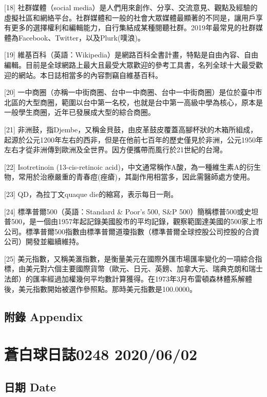 \documentclass[a5paper, 11pt
]{book}
\begin{document}
{[}18{]} 社群媒體（social
media）是人們用來創作、分享、交流意見、觀點及經驗的虛擬社區和網絡平台。社群媒體和一般的社會大眾媒體最顯著的不同是，讓用戶享有更多的選擇權利和編輯能力，自行集結成某種閱聽社群。2019年最常見的社群媒體為Facebook、Twitter，以及Plurk(噗浪)。

{[}19{]}
維基百科（英語：Wikipedia）是網路百科全書計畫，特點是自由內容、自由編輯。目前是全球網路上最大且最受大眾歡迎的參考工具書，名列全球十大最受歡迎的網站。本日誌相當多的內容剽竊自維基百科。

{[}20{]}
一中商圈（亦稱一中街商圈、台中一中商圈、台中一中街商圈）是位於臺中市北區的大型商圈，範圍以台中第一名校，也就是台中第一高級中學為核心，原本是一般學生商圈，近年已發展成大型的綜合商圈。

{[}21{]}
非洲鼓，指Djembe，又稱金貝鼓，由皮革鼓皮覆蓋高腳杯狀的木箱所組成，起源於公元1200年左右的西非，但是在他前七百年的歷史僅見於非洲，公元1950年左右才從非洲傳到歐洲及全世界。因方便攜帶而風行於21世紀的台灣。

{[}22{]} Isotretinoin (13-cis-retinoic
acid)，中文通常稱作A酸，為一種維生素A的衍生物，常用於治療嚴重的青春痘(痤瘡)，其副作用相當多，因此需醫師處方使用。

{[}23{]} QD，為拉丁文quaque die的縮寫，表示每日一劑。

{[}24{]} 標準普爾500（英語：Standard \& Poor's 500, S\&P
500）簡稱標普500或史坦普500，是一個由1957年起記錄美國股市的平均記錄，觀察範圍達美國的500家上市公司。標準普爾500指數由標準普爾道瓊指數（標準普爾全球控股公司控股的合資公司）開發並繼續維持。

{[}25{]}
美元指數，又稱美滙指數，是衡量美元在國際外匯市場匯率變化的一項綜合指標，由美元對六個主要國際貨幣（歐元、日元、英鎊、加拿大元、瑞典克朗和瑞士法郎）的匯率經過加權幾何平均數計算獲得。在1973年3月布雷頓森林體系解體後，美元指數開始被選作參照點。那時美元指數是100.0000。

\hypertarget{ux9644ux9304-appendix}{%
\subsection{附錄 Appendix}\label{ux9644ux9304-appendix}}

\hypertarget{ux84bcux767dux7403ux65e5ux8a8c0248-20200602}{%
\section{蒼白球日誌0248
2020/06/02}\label{ux84bcux767dux7403ux65e5ux8a8c0248-20200602}}

\hypertarget{ux65e5ux671f-date-1}{%
\subsection{日期 Date}\label{ux65e5ux671f-date-1}}
\end{document}
